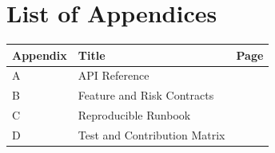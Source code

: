 \chapter*{List of Appendices}

\begin{tabularx}{\textwidth}{p{}Xr}
\toprule
Appendix & Title & Page\\
\midrule
A & API Reference & \pageref{app:api}\\
B & Feature and Risk Contracts & \pageref{app:contracts}\\
C & Reproducible Runbook & \pageref{app:runbook}\\
D & Test and Contribution Matrix & \pageref{app:tests}\\
\bottomrule
\end{tabularx}

